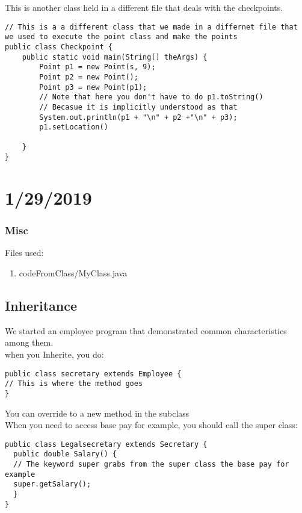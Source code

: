 \documentclass{article}
\begin{document}
This is another class held in a different file that deals with the 
checkpoints.
\begin{lstlisting}
// This is a a different class that we made in a differnet file that we used to execute the point class and make the points
public class Checkpoint {
    public static void main(String[] theArgs) {
        Point p1 = new Point(s, 9);
        Point p2 = new Point();
        Point p3 = new Point(p1);
        // Note that here you don't have to do p1.toString()
        // Becasue it is implicitly understood as that 
        System.out.println(p1 + "\n" + p2 +"\n" + p3);
        p1.setLocation()

    }
}

\end{lstlisting}

\section{1/29/2019}
\subsubsection{Misc}
Files used:

\begin{enumerate}
\item codeFromClass/MyClass.java
\end{enumerate}

\subsection{Inheritance}
We started an employee program that demonstrated common characteristics among them.\\
when you Inherite, you do:

\begin{lstlisting}
public class secretary extends Employee {
// This is where the method goes
}
\end{lstlisting}

You can override to a new method in the subclass\\
When you need to access base pay for example, you should call the super class:

\pagebreak

\begin{lstlisting}
public class Legalsecretary extends Secretary {
  public double Salary() {
  // The keyword super grabs from the super class the base pay for example  
  super.getSalary();
  }  
}
\end{lstlisting}
\end{document}
